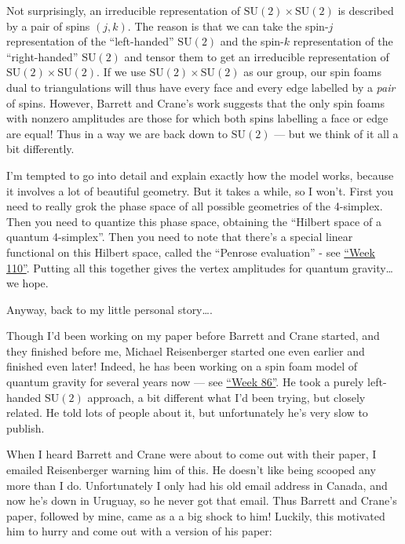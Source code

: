 \documentclass{article}
\begin{document}
Not surprisingly, an irreducible representation of
\(\mathrm{SU}(2)\times\mathrm{SU}(2)\) is described by a pair of spins
\((j,k)\). The reason is that we can take the spin-\(j\) representation
of the ``left-handed'' \(\mathrm{SU}(2)\) and the spin-\(k\)
representation of the ``right-handed'' \(\mathrm{SU}(2)\) and tensor
them to get an irreducible representation of
\(\mathrm{SU}(2)\times\mathrm{SU}(2)\). If we use
\(\mathrm{SU}(2)\times\mathrm{SU}(2)\) as our group, our spin foams dual
to triangulations will thus have every face and every edge labelled by a
\emph{pair} of spins. However, Barrett and Crane's work suggests that
the only spin foams with nonzero amplitudes are those for which both
spins labelling a face or edge are equal! Thus in a way we are back down
to \(\mathrm{SU}(2)\) --- but we think of it all a bit differently.

I'm tempted to go into detail and explain exactly how the model works,
because it involves a lot of beautiful geometry. But it takes a while,
so I won't. First you need to really grok the phase space of all
possible geometries of the 4-simplex. Then you need to quantize this
phase space, obtaining the ``Hilbert space of a quantum 4-simplex''.
Then you need to note that there's a special linear functional on this
Hilbert space, called the ``Penrose evaluation'' - see
\protect\hyperlink{week110}{``Week 110''}. Putting all this together
gives the vertex amplitudes for quantum gravity\ldots{} we hope.

Anyway, back to my little personal story\ldots.

Though I'd been working on my paper before Barrett and Crane started,
and they finished before me, Michael Reisenberger started one even
earlier and finished even later! Indeed, he has been working on a spin
foam model of quantum gravity for several years now --- see
\protect\hyperlink{week86}{``Week 86''}. He took a purely left-handed
\(\mathrm{SU}(2)\) approach, a bit different what I'd been trying, but
closely related. He told lots of people about it, but unfortunately he's
very slow to publish.

When I heard Barrett and Crane were about to come out with their paper,
I emailed Reisenberger warning him of this. He doesn't like being
scooped any more than I do. Unfortunately I only had his old email
address in Canada, and now he's down in Uruguay, so he never got that
email. Thus Barrett and Crane's paper, followed by mine, came as a a big
shock to him! Luckily, this motivated him to hurry and come out with a
version of his paper:
\end{document}
